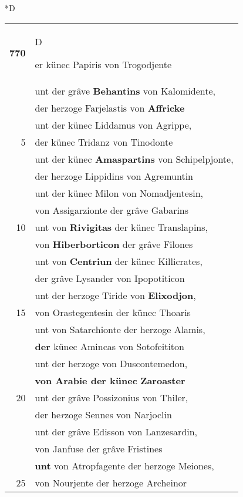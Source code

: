 \documentclass[8pt,a4paper,notitlepage]{article}
\begin{document}
\begin{table}[ht]
\begin{minipage}[t]{0.5\linewidth}
\small
\begin{center}*D
\end{center}
\begin{tabular}{rl}
\textbf{770} & \begin{large}D\end{large}er künec Papiris von Trogodjente\\ 
 & unt der grâve \textbf{Behantins} von Kalomidente,\\ 
 & der herzoge Farjelastis von \textbf{Affricke}\\ 
 & unt der künec Liddamus von Agrippe,\\ 
5 & der künec Tridanz von Tinodonte\\ 
 & unt der künec \textbf{Amaspartins} von Schipelpjonte,\\ 
 & der herzoge Lippidins von Agremuntin\\ 
 & unt der künec Milon von Nomadjentesin,\\ 
 & von Assigarzionte der grâve Gabarins\\ 
10 & unt von \textbf{Rivigitas} der künec Translapins,\\ 
 & von \textbf{Hiberborticon} der grâve Filones\\ 
 & unt von \textbf{Centriun} der künec Killicrates,\\ 
 & der grâve Lysander von Ipopotiticon\\ 
 & unt der herzoge Tiride von \textbf{Elixodjon},\\ 
15 & von Orastegentesin der künec Thoaris\\ 
 & unt von Satarchionte der herzoge Alamis,\\ 
 & \textbf{der} künec Amincas von Sotofeititon\\ 
 & unt der herzoge von Duscontemedon,\\ 
 & \textbf{von Arabie der künec} \textbf{Zaroaster}\\ 
20 & unt der grâve Possizonius von Thiler,\\ 
 & der he\textit{r}zoge Sennes von Narjoclin\\ 
 & unt der grâve Edisson von Lanzesardin,\\ 
 & von Janfuse der grâve Fristines\\ 
 & \textbf{unt} von Atropfagente der herzoge Meiones,\\ 
25 & von Nourjente der herzoge Archeinor\\ 

\end{tabular}
\end{minipage}
\end{table}
\end{document}
